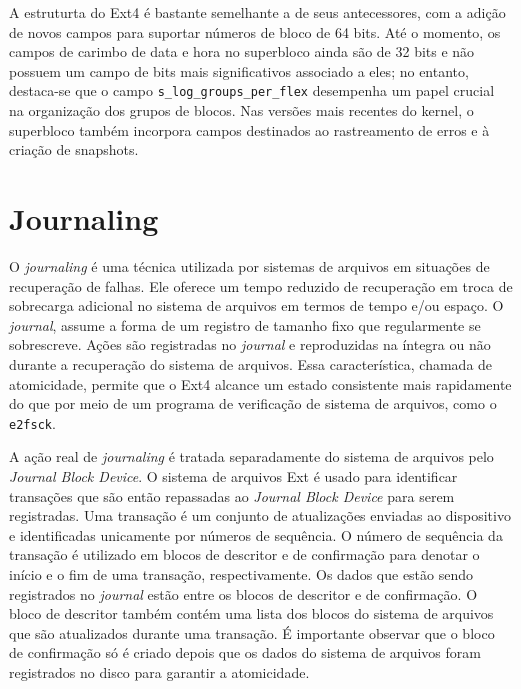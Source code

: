 \documentclass[
	12pt,				%
	openright,			%
	oneside,			%
	a4paper,			%
	chapter=TITLE,		%
	english,			%
	french,				%
	spanish,			%
	brazil				%
	]{abntex2}
\theoremstyle{definition}
\begin{document}
A estruturta do Ext4 é bastante semelhante a de seus antecessores, com a adição de novos campos para 
suportar números de bloco de 64 bits. Até o momento, os campos de carimbo de data e hora no superbloco 
ainda são de 32 bits e não possuem um campo de bits mais significativos associado a eles; no entanto, 
destaca-se que o campo \texttt{s\_log\_groups\_per\_flex} desempenha um papel crucial na organização 
dos grupos de blocos. Nas versões mais recentes do kernel, o superbloco também incorpora campos 
destinados ao rastreamento de erros e à criação de snapshots.


\section{Journaling}\label{sec:journaling}

O \textit{journaling} é uma técnica utilizada por sistemas de arquivos em situações de 
recuperação de falhas. Ele oferece um tempo reduzido de recuperação em troca de sobrecarga 
adicional no sistema de arquivos em termos de tempo e/ou espaço. O \textit{journal}, 
assume a forma de um registro de tamanho fixo que regularmente se sobrescreve. Ações são 
registradas no \textit{journal} e reproduzidas na íntegra ou não durante a recuperação do 
sistema de arquivos. Essa característica, chamada de atomicidade, permite que o Ext4 alcance 
um estado consistente mais rapidamente do que por meio de um programa de verificação de sistema 
de arquivos, como o \texttt{e2fsck}.

A ação real de \textit{journaling} é tratada separadamente do sistema de arquivos 
pelo \textit{Journal Block Device}. O sistema de arquivos Ext é usado para identificar 
transações que são então repassadas ao \textit{Journal Block Device} para serem registradas. 
Uma transação é um conjunto de atualizações enviadas ao dispositivo e identificadas unicamente 
por números de sequência. O número de sequência da transação é utilizado em blocos de descritor 
e de confirmação para denotar o início e o fim de uma transação, respectivamente. Os dados que 
estão sendo registrados no \textit{journal} estão entre os blocos de descritor e de confirmação. 
O bloco de descritor também contém uma lista dos blocos do sistema de arquivos que são atualizados 
durante uma transação. É importante observar que o bloco de confirmação só é criado depois 
que os dados do sistema de arquivos foram registrados no disco para garantir a atomicidade.
\end{document}
